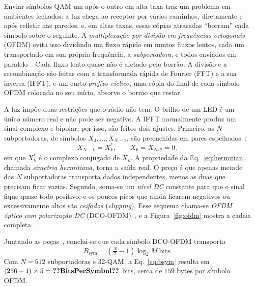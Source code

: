 

Enviar símbolos QAM um após o outro em alta taxa traz um problema em ambientes
fechados: a luz chega ao receptor por vários caminhos, diretamente e após
refletir nas paredes, e, em altas taxas, essas cópias atrasadas ``borram'' cada
símbolo sobre o seguinte. A \emph{multiplexação por divisão em frequências
ortogonais} (OFDM) evita isso dividindo um fluxo rápido em muitos fluxos lentos,
cada um transportado em sua própria frequência, a \emph{subportadora}, e todos
enviados em paralelo~\cite{armstrong2013ofdm}. Cada fluxo lento quase não é
afetado pelo borrão. A divisão e a recombinação são feitas com a transformada
rápida de Fourier (FFT) e a sua inversa (IFFT), e um curto \emph{prefixo
cíclico}, uma cópia do final de cada símbolo OFDM colocada no seu início,
absorve o borrão que restar.

A luz impõe duas restrições que o rádio não tem. O brilho de um LED é um único
número real e não pode ser negativo. A IFFT normalmente produz um sinal
complexo e bipolar; por isso, são feitos dois ajustes. Primeiro, as $N$
subportadoras, de símbolos $X_0,\dots,X_{N-1}$, são preenchidas em pares
espelhados~\cite{armstrong2013ofdm}:
\begin{equation}
X_{N-k} = X_k^{*}, \qquad X_0 = X_{N/2} = 0,
\label{eq:hermitian}
\end{equation}
em que $X_k^{*}$ é o complexo conjugado de $X_k$. A propriedade da
Eq.~\eqref{eq:hermitian}, chamada \emph{simetria hermitiana}, torna a saída
real. O preço é que apenas metade das $N$ subportadoras transporta dados
independentes, menos as duas que precisam ficar vazias. Segundo, soma-se um
\emph{nível DC} constante para que o sinal fique quase todo positivo, e os
poucos picos que ainda ficarem negativos ou excessivamente altos são
\emph{ceifados} (\emph{clipping}). Esse esquema chama-se \emph{OFDM óptico com
polarização DC} (DCO-OFDM)~\cite{armstrong2013ofdm}, e a Figura~\ref{fig:ofdm}
mostra a cadeia completa.



Juntando as peças~\cite{armstrong2013ofdm}, conclui-se que cada símbolo
DCO-OFDM transporta
\begin{equation}
B_{\mathrm{sym}} = \left(\tfrac{N}{2}-1\right)\log_2 M \ \text{bits}.
\label{eq:bsym}
\end{equation}
Com $N=512$ subportadoras e 32-QAM, a Eq.~\eqref{eq:bsym} resulta em
$(256-1)\times5 = \val{BitsPerSymbol}$ bits, cerca de $159$ bytes por símbolo
OFDM.

